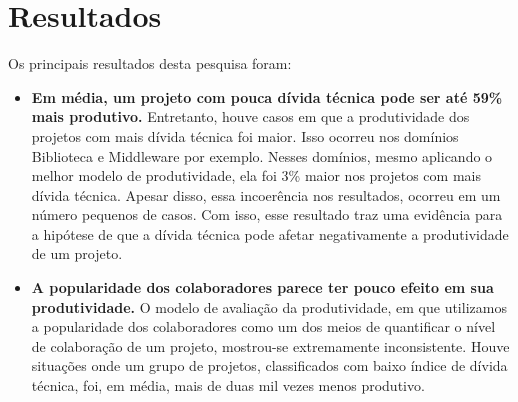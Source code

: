\section{Resultados}

Os principais resultados desta pesquisa foram:

\begin{itemize}

\item \textbf{ Em média, um projeto com pouca dívida técnica pode ser até 59\% mais produtivo.}  Entretanto, houve casos em que a produtividade dos projetos com mais dívida técnica foi maior. Isso ocorreu nos domínios Biblioteca e Middleware por exemplo. Nesses domínios, mesmo aplicando o melhor modelo de produtividade, ela foi 3\% maior nos projetos com mais dívida técnica. Apesar disso, essa incoerência nos resultados, ocorreu em um número pequenos de casos. Com isso, esse resultado traz uma evidência para a hipótese de que a dívida técnica pode afetar negativamente a produtividade de um projeto. 


\item \textbf{A popularidade dos colaboradores parece ter pouco efeito em sua produtividade.} O modelo de avaliação da produtividade, em que utilizamos a popularidade dos colaboradores como um dos meios de quantificar o nível de colaboração de um projeto, mostrou-se extremamente inconsistente. Houve situações onde um grupo de projetos, classificados com baixo índice de dívida técnica, foi, em média, mais de duas mil vezes menos produtivo. 


\end{itemize}
